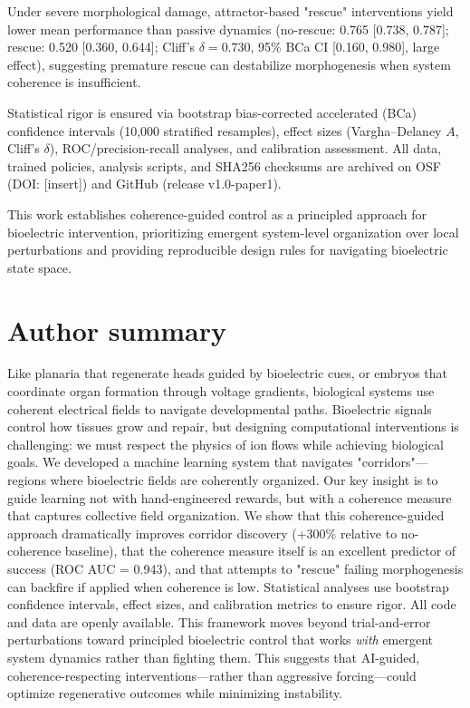 \documentclass[10pt,letterpaper]{article}
\begin{document}
Under severe morphological damage, attractor-based "rescue" interventions yield lower mean performance than passive dynamics (no-rescue: 0.765 [0.738, 0.787]; rescue: 0.520 [0.360, 0.644]; Cliff's $\delta = 0.730$, 95\% BCa CI [0.160, 0.980], large effect), suggesting premature rescue can destabilize morphogenesis when system coherence is insufficient.

Statistical rigor is ensured via bootstrap bias-corrected accelerated (BCa) confidence intervals (10,000 stratified resamples), effect sizes (Vargha–Delaney $A$, Cliff's $\delta$), ROC/precision-recall analyses, and calibration assessment. All data, trained policies, analysis scripts, and SHA256 checksums are archived on OSF (DOI: [insert]) and GitHub (release v1.0-paper1).

This work establishes coherence-guided control as a principled approach for bioelectric intervention, prioritizing emergent system-level organization over local perturbations and providing reproducible design rules for navigating bioelectric state space.

\section*{Author summary}

Like planaria that regenerate heads guided by bioelectric cues, or embryos that coordinate organ formation through voltage gradients, biological systems use coherent electrical fields to navigate developmental paths. Bioelectric signals control how tissues grow and repair, but designing computational interventions is challenging: we must respect the physics of ion flows while achieving biological goals. We developed a machine learning system that navigates "corridors"—regions where bioelectric fields are coherently organized. Our key insight is to guide learning not with hand-engineered rewards, but with a coherence measure that captures collective field organization. We show that this coherence-guided approach dramatically improves corridor discovery (+300\% relative to no-coherence baseline), that the coherence measure itself is an excellent predictor of success (ROC AUC = 0.943), and that attempts to "rescue" failing morphogenesis can backfire if applied when coherence is low. Statistical analyses use bootstrap confidence intervals, effect sizes, and calibration metrics to ensure rigor. All code and data are openly available. This framework moves beyond trial-and-error perturbations toward principled bioelectric control that works \emph{with} emergent system dynamics rather than fighting them. This suggests that AI-guided, coherence-respecting interventions—rather than aggressive forcing—could optimize regenerative outcomes while minimizing instability.
\end{document}
